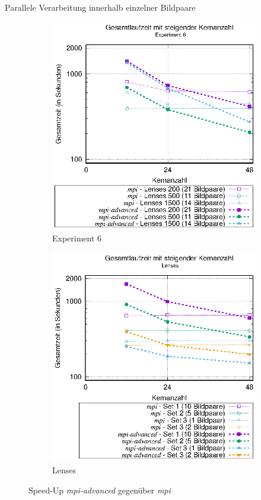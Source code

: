 \begin{frame}[allowframebreaks]{Parallele Verarbeitung innerhalb einzelner Bildpaare}
	\framebreak
	
	\begin{figure}[h]
		\begin{subfigure}[b]{0.47\textwidth}
			\centering
			\includegraphics[width=\textwidth]{pdf/mpi_advanced_times_exp6}
			\caption{Experiment 6}
		\end{subfigure}
		\hfill
		\begin{subfigure}[b]{0.47\textwidth}
			\centering
			\includegraphics[width=\textwidth]{pdf/mpi_advanced_times_lenses}
			\caption{Lenses}
		\end{subfigure}
		\caption{Speed-Up \textit{mpi-advanced} gegenüber \textit{mpi}}
	\end{figure}
\end{frame}

